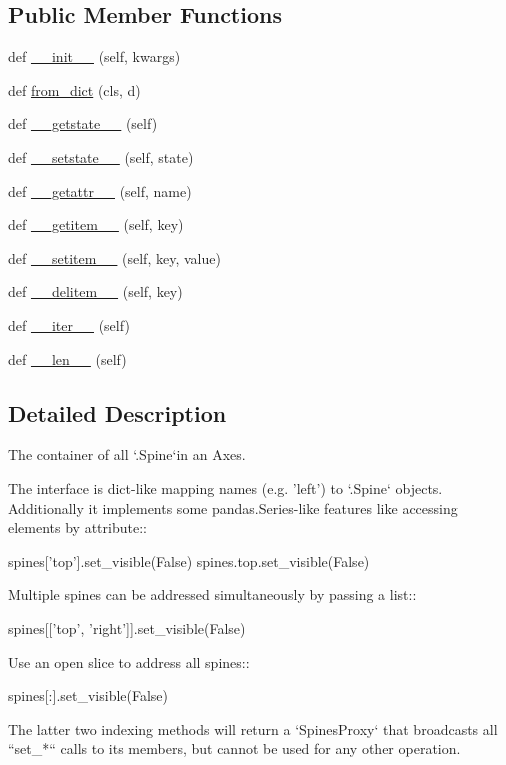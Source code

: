 \subsection*{Public Member Functions}
\begin{DoxyCompactItemize}
\item 
def \hyperlink{classmatplotlib_1_1spines_1_1Spines_ad5cbe055785eaf834a6e2c405ee791cc}{\+\_\+\+\_\+init\+\_\+\+\_\+} (self, kwargs)
\item 
def \hyperlink{classmatplotlib_1_1spines_1_1Spines_a1e8c091dfda1d51deb167542833e46b0}{from\+\_\+dict} (cls, d)
\item 
def \hyperlink{classmatplotlib_1_1spines_1_1Spines_a0aa42fde258738858db8a4897ed4cae8}{\+\_\+\+\_\+getstate\+\_\+\+\_\+} (self)
\item 
def \hyperlink{classmatplotlib_1_1spines_1_1Spines_a55614fa7681ed17908ff5cf3efe605c0}{\+\_\+\+\_\+setstate\+\_\+\+\_\+} (self, state)
\item 
def \hyperlink{classmatplotlib_1_1spines_1_1Spines_aad641177988cb46d9bdb56afd58fdd1e}{\+\_\+\+\_\+getattr\+\_\+\+\_\+} (self, name)
\item 
def \hyperlink{classmatplotlib_1_1spines_1_1Spines_acd4c96a29c9f3765cadc7f3b98885790}{\+\_\+\+\_\+getitem\+\_\+\+\_\+} (self, key)
\item 
def \hyperlink{classmatplotlib_1_1spines_1_1Spines_a0916c7bfdd5b11da4977746e18a1a6dd}{\+\_\+\+\_\+setitem\+\_\+\+\_\+} (self, key, value)
\item 
def \hyperlink{classmatplotlib_1_1spines_1_1Spines_a834cfdf6e7c420a654c03a2d107f7aa5}{\+\_\+\+\_\+delitem\+\_\+\+\_\+} (self, key)
\item 
def \hyperlink{classmatplotlib_1_1spines_1_1Spines_ae460ef4f3882e1de4d5e46717283fc32}{\+\_\+\+\_\+iter\+\_\+\+\_\+} (self)
\item 
def \hyperlink{classmatplotlib_1_1spines_1_1Spines_ab97587b94247789a48713680e5fc425d}{\+\_\+\+\_\+len\+\_\+\+\_\+} (self)
\end{DoxyCompactItemize}


\subsection{Detailed Description}
\begin{DoxyVerb}The container of all `.Spine`\s in an Axes.

The interface is dict-like mapping names (e.g. 'left') to `.Spine` objects.
Additionally it implements some pandas.Series-like features like accessing
elements by attribute::

    spines['top'].set_visible(False)
    spines.top.set_visible(False)

Multiple spines can be addressed simultaneously by passing a list::

    spines[['top', 'right']].set_visible(False)

Use an open slice to address all spines::

    spines[:].set_visible(False)

The latter two indexing methods will return a `SpinesProxy` that broadcasts
all ``set_*`` calls to its members, but cannot be used for any other
operation.
\end{DoxyVerb}
 

